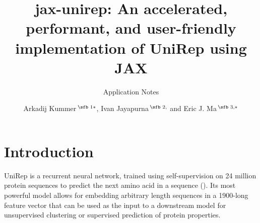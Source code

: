 \documentclass{bioinfo}
\begin{document}

\subtitle{Application Notes}

\title[short Title]{jax-unirep: An accelerated, performant, and user-friendly implementation of UniRep using JAX}
\author[Sample \textit{et~al}.]{
    Arkadij Kummer\,$^{\text{\sfb 1}*}$, Ivan Jayapurna\,$^{\text{\sfb 2,}}$ and Eric J. Ma\,$^{\text{\sfb 3,}*}$}
\address{
    $^{\text{\sf 1}}$Global Discovery Chemistry, Novartis Institutes for Biomedical Research, Basel, Switzerland \\
    $^{\text{\sf 2}}$University of California at Berkeley, Berkeley, CA, United States of America \\
    $^{\text{\sf 3}}$NIBR Informatics, Novartis Institutes for Biomedical Research, Cambridge, MA, United States of America \\
}





\maketitle

\section{Introduction}

UniRep is a recurrent neural network,
trained using self-supervision
on 24 million protein sequences
to predict the next amino acid in a sequence (\cite{alley2019unified}).
Its most powerful model allows for embedding
arbitrary length sequences in a 1900-long feature vector
that can be used as the input to a downstream model
for unsupervised clustering or supervised prediction of protein properties.
\end{document}
